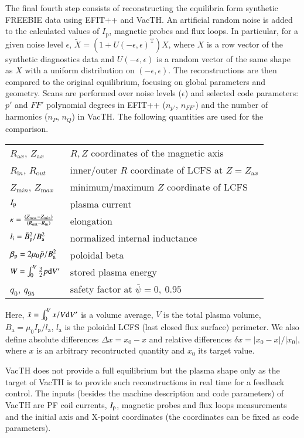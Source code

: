 The final fourth step consists of reconstructing the equilibria form synthetic FREEBIE data using EFIT++ and VacTH. 
An artificial random noise is added to the calculated values of $I_\mathrm{p}$, magnetic probes and flux loops. In particular, for a given noise level $\epsilon$, $\tilde X = \left( {1 + U\left( { - \epsilon, \epsilon} \right)^\mathrm{T}} \right)X$, where $X$ is a row vector of the synthetic diagnostics data and $U\left( { - \epsilon, \epsilon} \right)$ is a random vector of the same shape as $X$ with a uniform distribution on $\left( { - \epsilon, \epsilon} \right)$.
The reconstructions are then compared to the original equilibrium, focusing on global parameters and geometry. Scans are performed over noise levels ($\epsilon$) and selected code parameters: $p'$ and $FF'$ polynomial degrees in EFIT++ ($n_{p'}$, $n_{FF'}$) and the number of harmonics ($n_P$, $n_Q$) in VacTH. The following quantities are used for the comparison.
\begin{table}[!h]
    \begin{tabular}{ll}
    $R_{\mathrm ax}$, $Z_{\mathrm ax}$ & $R,Z$ coordinates of the magnetic axis \\
    $R_{\mathrm in}$, $R_{\mathrm out}$ & inner/outer $R$ coordinate of LCFS at $Z=Z_{\mathrm ax}$ \\
    $Z_{\mathrm min}$, $Z_{\mathrm max}$ & minimum/maximum $Z$ coordinate of LCFS \\
    $I_{\rm{p}}$ & plasma current \\
    $\kappa  = \frac{\left( {{Z_{{\rm{max}}}} - {Z_{{\rm{min}}}}} \right) } { \left( {{R_{{\rm{out}}}} - {R_{{\rm{in}}}}} \right) }$          & elongation   \\
    ${l_{\rm{i}}} = {{\bar B_{\rm{p}}^2}} / {{B_{\rm{a}}^2}}$          & normalized internal inductance   \\
    ${\beta _{\rm{p}}} = {{2{\mu _0}\bar p}} / {{B_{\rm{a}}^2}}$          & poloidal beta   \\
    $ W = \int_0^V {\frac{3}{2}p{\rm{d}}V'}$ & stored plasma energy \\
    $ q_0$, $q_{95}$ & safety factor at $\bar \psi = 0,\ 0.95$ \\
    \end{tabular}
\end{table}

Here, $\bar x = \int_0^V {x/V{\rm{d}}V'} $ is a volume average, $V$ is the total plasma volume, $B_{\mathrm a} = \mu _0 I_\mathrm{p} / l_{\mathrm a}$, $l_{\mathrm a}$ is the poloidal LCFS (last closed flux surface) perimeter.
We also define absolute differences $\Delta x = {{x_0} - x} $ and relative differences $\delta x = \left| {{x_0} - x} \right|/\left| {{x_0}} \right|$, where $x$ is an arbitrary recontructed quantity and $x_0$ its target value.

VacTH does not provide a full equilibrium but the plasma shape only as the target of VacTH is to provide such reconstructions in real time for a feedback control. The inputs (besides the machine description and code parameters) of VacTH are PF coil currents, $I_{\rm{p}}$, magnetic probes and flux loops measurements and the initial axis and X-point coordinates (the coordinates can be fixed as code parameters).


